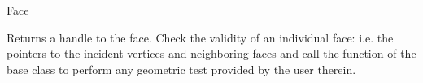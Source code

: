 \begin{ccRefClass}{Face}
 
{Returns a handle to the face.}
\ccGlue
{} 
{Check the validity of an individual face:
i.e. the pointers to the incident vertices
and neighboring faces
 and call the 
function of the base class to perform any geometric test provided by the user
therein.}


\ccSeeAlso
{} \\
 \\
 \\
 \\
 \\
 \\
\end{ccRefClass}


